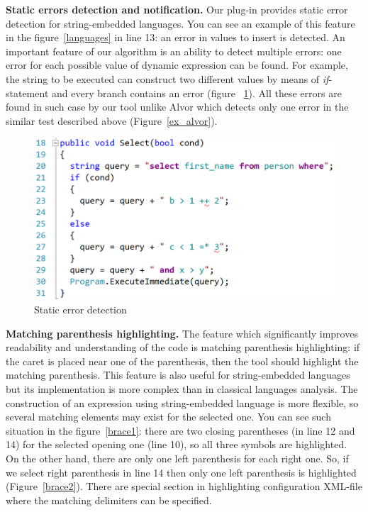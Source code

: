 \documentclass{acm_proc_article-sp}
\begin{document}
{\bf Static errors detection and notification.} Our plug-in provides static error detection for string-embedded languages. You can see an example of this feature in the figure~\ref{languages} in line 13: an error in values to insert is detected. An important feature of our algorithm is an ability to detect multiple errors: one error for each possible value of dynamic expression can be found. For example, the string to be executed can construct two different values by means of {\it if}-statement and every branch contains an error (figure ~\ref{staticErrors}). All these errors are found in such case by our tool unlike Alvor which detects only one error in the similar test described above (Figure~\ref{ex_alvor}).

\begin{figure}[h!]
    \begin{center}
        \includegraphics[scale=0.3]{graphics/Select_like_Alvor_example.png}
    \end{center}
    \caption{Static error detection}
    \label{staticErrors}
\end{figure}

{\bf Matching parenthesis highlighting.} The feature which significantly improves readability and understanding of the code is matching parenthesis highlighting: if the caret is placed near one  of the parenthesis, then the tool should highlight the matching parenthesis. This feature is also useful for string-embedded languages but its implementation is more complex than in classical languages analysis. The construction of an expression using string-embedded language is more flexible, so several matching elements may exist for the selected one. You can see such situation in the figure~\ref{brace1}: there are two closing parentheses (in line 12 and 14) for the selected opening one (line 10), so all three symbols are highlighted. On the other hand, there are only one left parenthesis for each right one. So, if we select right parenthesis in line 14 then only one left parenthesis is highlighted (Figure~\ref{brace2}). There are special section in highlighting configuration XML-file where the matching delimiters can be specified.
\end{document}
